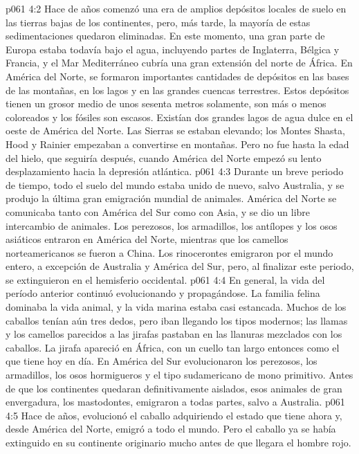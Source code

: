 \vs p061 4:2 \pc Hace  de años comenzó una era de amplios depósitos locales de suelo en las tierras bajas de los continentes, pero, más tarde, la mayoría de estas sedimentaciones quedaron eliminadas. En este momento, una gran parte de Europa estaba todavía bajo el agua, incluyendo partes de Inglaterra, Bélgica y Francia, y el Mar Mediterráneo cubría una gran extensión del norte de África. En América del Norte, se formaron importantes cantidades de depósitos en las bases de las montañas, en los lagos y en las grandes cuencas terrestres. Estos depósitos tienen un grosor medio de unos sesenta metros solamente, son más o menos coloreados y los fósiles son escasos. Existían dos grandes lagos de agua dulce en el oeste de América del Norte. Las Sierras se estaban elevando; los Montes Shasta, Hood y Rainier empezaban a convertirse en montañas. Pero no fue hasta la edad del hielo, que seguiría después, cuando América del Norte empezó su lento desplazamiento hacia la depresión atlántica.
\vs p061 4:3 Durante un breve periodo de tiempo, todo el suelo del mundo estaba unido de nuevo, salvo Australia, y se produjo la última gran emigración mundial de animales. América del Norte se comunicaba tanto con América del Sur como con Asia, y se dio un libre intercambio de animales. Los perezosos, los armadillos, los antílopes y los osos asiáticos entraron en América del Norte, mientras que los camellos norteamericanos se fueron a China. Los rinocerontes emigraron por el mundo entero, a excepción de Australia y América del Sur, pero, al finalizar este periodo, se extinguieron en el hemisferio occidental.
\vs p061 4:4 En general, la vida del período anterior continuó evolucionando y propagándose. La familia felina dominaba la vida animal, y la vida marina estaba casi estancada. Muchos de los caballos tenían aún tres dedos, pero iban llegando los tipos modernos; las llamas y los camellos parecidos a las jirafas pastaban en las llanuras mezclados con los caballos. La jirafa apareció en África, con un cuello tan largo entonces como el que tiene hoy en día. En América del Sur evolucionaron los perezosos, los armadillos, los osos hormigueros y el tipo sudamericano de mono primitivo. Antes de que los continentes quedaran definitivamente aislados, esos animales de gran envergadura, los mastodontes, emigraron a todas partes, salvo a Australia.
\vs p061 4:5 \pc Hace  de años, evolucionó el caballo adquiriendo el estado que tiene ahora y, desde América del Norte, emigró a todo el mundo. Pero el caballo ya se había extinguido en su continente originario mucho antes de que llegara el hombre rojo.
